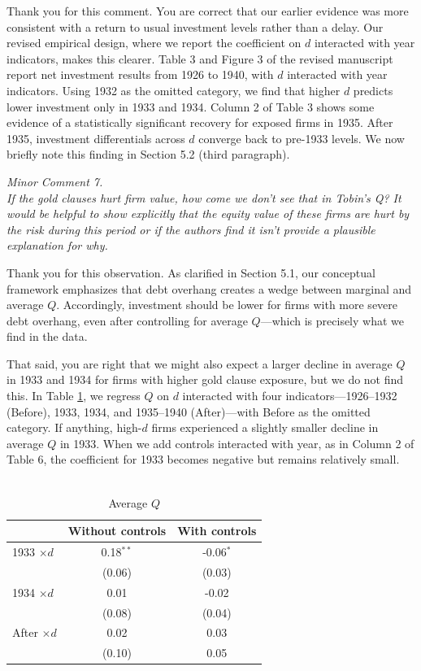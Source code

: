 \bigskip

\noindent Thank you for this comment. You are correct that our earlier evidence was more consistent with a return to usual investment levels rather than a delay. Our revised empirical design, where we report the coefficient on $d$ interacted with year indicators, makes this clearer. Table 3 and Figure 3 of the revised manuscript report net investment results from 1926 to 1940, with $d$ interacted with year indicators. Using 1932 as the omitted category, we find that higher $d$ predicts lower investment only in 1933 and 1934. Column 2 of Table 3 shows some evidence of a statistically significant recovery for exposed firms in 1935. After 1935, investment differentials across $d$ converge back to pre-1933 levels. We now briefly note this finding in Section 5.2 (third paragraph).

\noindent \textit{\textcolor{red!60!black}{
Minor Comment 7.\\
If the gold clauses hurt firm value, how come we don't see that in Tobin's Q? It would be helpful to show explicitly that the equity value of these firms are hurt by the risk during this period or if the authors find it isn't provide a plausible explanation for why.
}}

\bigskip 

\noindent Thank you for this observation. As clarified in Section 5.1, our conceptual framework emphasizes that debt overhang creates a wedge between marginal and average $Q$. Accordingly, investment should be lower for firms with more severe debt overhang, even after controlling for average $Q$—which is precisely what we find in the data.

That said, you are right that we might also expect a larger decline in average $Q$ in 1933 and 1934 for firms with higher gold clause exposure, but we do not find this. In Table \ref{tab:Q}, we regress $Q$ on $d$ interacted with four indicators—1926–1932 (Before), 1933, 1934, and 1935–1940 (After)—with Before as the omitted category. If anything, high-$d$ firms experienced a slightly smaller decline in average $Q$ in 1933. When we add controls interacted with year, as in Column 2 of Table 6, the coefficient for 1933 becomes negative but remains relatively small.

 \begin{table}[h]
    \centering
    \begin{tabular}{lcc}
    \toprule
   & Without controls & With controls \\
    \midrule
  1933 $\times d$ &0.18$^{**}$ & -0.06$^{*}$\\
                  &(0.06)      &(0.03) \\
  1934 $\times d$ & 0.01 & -0.02\\
                & (0.08) & (0.04)\\
  After $\times d$ & 0.02 & 0.03\\
                   &(0.10) & 0.05\\
    \bottomrule
    \end{tabular}
    \caption{\\ Average $Q$}
    \label{tab:Q}
    \end{table}



